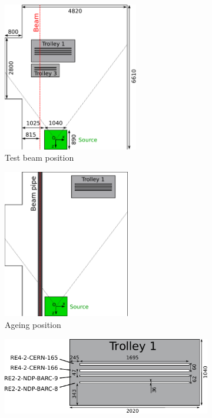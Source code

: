 	\begin{figure}[H]
    	\begin{subfigure}{0.5\linewidth}
			\centering
    		\includegraphics[height = 65mm]{fig/chapt5/GIFpp-Setup-A.pdf}
        	\caption{\label{fig:GIFppSetup:A} Test beam position}
    	\end{subfigure}
    	\begin{subfigure}{0.5\linewidth}
			\centering
    		\includegraphics[height = 65mm]{fig/chapt5/GIFpp-Setup-B.pdf}
        	\caption{\label{fig:GIFppSetup:B} Ageing position}
    	\end{subfigure}
    	\begin{subfigure}{\linewidth}
    		\vspace*{5mm}
			\centering
    		\includegraphics[width = 0.8\plotwidth]{fig/chapt5/GIFpp-T1.pdf}

\end{subfigure}
\end{figure}
